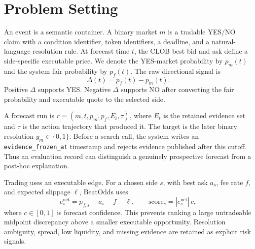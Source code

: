 \section{Problem Setting}

An event is a semantic container. A binary market $m$ is a tradable YES/NO claim with a condition identifier, token identifiers, a deadline, and a natural-language resolution rule. At forecast time $t$, the CLOB best bid and ask define a side-specific executable price. We denote the YES-market probability by $p_m(t)$ and the system fair probability by $p_f(t)$. The raw directional signal is
\[
  \Delta(t) = p_f(t)-p_m(t).
\]
Positive $\Delta$ supports YES. Negative $\Delta$ supports NO after converting the fair probability and executable quote to the selected side.

A forecast run is $r=(m,t,p_m,p_f,E_t,\tau)$, where $E_t$ is the retained evidence set and $\tau$ is the action trajectory that produced it. The target is the later binary resolution $y_m\in\{0,1\}$. Before a search call, the system writes an \texttt{evidence\_frozen\_at} timestamp and rejects evidence published after this cutoff. Thus an evaluation record can distinguish a genuinely prospective forecast from a post-hoc explanation.

Trading uses an executable edge. For a chosen side $s$, with best ask $a_s$, fee rate $f$, and expected slippage $\ell$, BeatOdds uses
\[
  e^{\mathrm{net}}_s = p_{f,s} - a_s - f - \ell,
  \qquad \mathrm{score}_s=|e^{\mathrm{net}}_s|\,c,
\]
where $c\in[0,1]$ is forecast confidence. This prevents ranking a large untradeable midpoint discrepancy above a smaller executable opportunity. Resolution ambiguity, spread, low liquidity, and missing evidence are retained as explicit risk signals.
